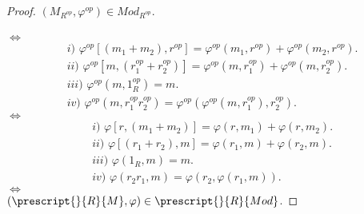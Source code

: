 \documentclass{article}
\theoremstyle{definition}
\theoremstyle{plain}
\theoremstyle{plain}
\theoremstyle{definition}
\theoremstyle{definition}
\theoremstyle{definition}
\theoremstyle{definition}
\theoremstyle{definition}
\theoremstyle{definition}
\begin{document}
\begin{enumerate}[label=\textbf{Ej \arabic*.}]
\begin{proof}
$(M_{R^{op}},\varphi^{op})\in Mod_{R^{op}}$.\\\\
$\iff$
\begin{align*}
& i)\,\,\varphi^{op}[(m_1+m_2),r^{op}]=\varphi^{op}(m_1,r^{op})+\varphi^{op}(m_2,r^{op}).\\
& ii)\,\,\varphi^{op}[m,(r_1^{op}+r_2^{op})]=\varphi^{op}(m,r_1^{op})+\varphi^{op}(m,r_2^{op}).\\
& iii)\,\, \varphi^{op}(m,1_R^{op})=m.\\
& iv)\,\, \varphi^{op}(m,r_1^{op}r_2^{op})=\varphi^{op}(\varphi^{op}(m,r_1^{op}),r_2^{op}).
\end{align*}
 $\iff$
\begin{align*}
& i)\,\,\varphi[r,(m_1+m_2)]=\varphi(r,m_1)+\varphi(r,m_2).\\
& ii)\,\,\varphi[(r_1+r_2),m]=\varphi(r_1,m)+\varphi(r_2,m).\\
& iii)\,\, \varphi(1_R,m)=m.\\
& iv)\,\, \varphi(r_2r_1,m)=\varphi(r_2,\varphi(r_1,m)).
\end{align*}
 $\iff$\\
 
 $(\prescript{}{R}{M},\varphi)\in  \prescript{}{R}{Mod}$.
 \end{proof}
 

\end{enumerate}
\end{document}

